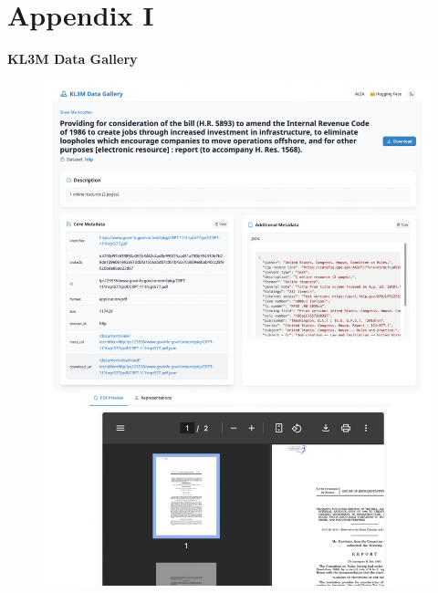 
\pagebreak
\setcounter{secnumdepth}{0}
\appendix
\section{Appendix I}
\setcounter{secnumdepth}{0}
\large {\textbf{KL3M Data Gallery}}
\begin{figure}[h!]
\centering
\includegraphics[width=120mm]{KL3MGallery.png}
\caption{}
\label{fig:method}
\end{figure}





\pagebreak

